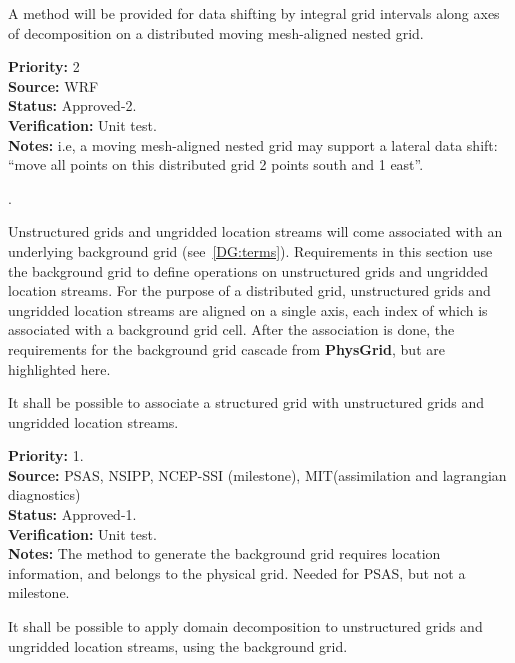 
A method will be provided for data shifting by integral grid intervals
along axes of decomposition on a distributed moving mesh-aligned
nested grid.

\begin{reqlist}
{\bf Priority:} 2 \\
{\bf Source:} WRF \\
{\bf Status:} Approved-2. \\
{\bf Verification:} Unit test. \\
{\bf Notes:} i.e, a moving mesh-aligned nested grid may support a
  lateral data shift: ``move all points on this distributed grid 2
  points south and 1 east''.
\end{reqlist}

 \label{DG:Unstructured}.

Unstructured grids and ungridded location streams will come associated
with an underlying background grid (see~\ref{DG:terms}). Requirements
in this section use the background grid to define operations on
unstructured grids and ungridded location streams. For the purpose of
a distributed grid, unstructured grids and ungridded location streams are
aligned on a single axis, each index of which is associated with a
background grid cell. After the association is done, the requirements
for the background grid cascade from \textbf{PhysGrid}, but are
highlighted here.


It shall be possible to associate a structured grid with unstructured
grids and ungridded location streams.

\begin{reqlist}
{\bf Priority:} 1. \\ 
{\bf Source:} PSAS, NSIPP, NCEP-SSI (milestone), MIT(assimilation  and lagrangian diagnostics) \\
{\bf Status:} Approved-1. \\
{\bf Verification:} Unit test. \\
{\bf Notes:} The method to generate the background grid requires
  location information, and belongs to the physical grid.  Needed
  for PSAS, but not a milestone.
\end{reqlist}


It shall be possible to apply domain decomposition to unstructured
grids and ungridded location streams, using the background grid.

